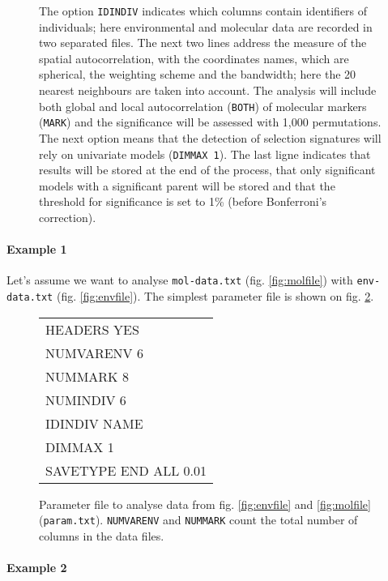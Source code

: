 \documentclass[a4paper,11pt]{article}
\begin{document}
\begin{figure}[htbp]
{The option \texttt{IDINDIV} indicates which columns contain identifiers of individuals; here environmental and molecular data are recorded in two separated files.
The next two lines address the measure of the spatial autocorrelation, with the coordinates names, which are spherical, the weighting scheme and the bandwidth; here the 20 nearest neighbours are taken into account.
The analysis will include both global and local autocorrelation (\texttt{BOTH}) of molecular markers (\texttt{MARK}) and the significance will be assessed with 1,000 permutations.
The next option means that the detection of selection signatures will rely on univariate models (\texttt{DIMMAX 1}).
The last ligne indicates that results will be stored at the end of the process, that only significant models with a significant parent will be stored and that the threshold for significance is set to 1\% (before Bonferroni's correction).
}
\label{fig:fichier-param-general}
\end{figure}

\paragraph{Example 1} 
Let's assume we want to analyse \verb+mol-data.txt+ (fig. \ref{fig:molfile}) with \verb+env-data.txt+ (fig. \ref{fig:envfile}).
The simplest parameter file is shown on fig. \ref{fig:fichier-param}.

\begin{figure}[htbp]
\centering
\ttfamily
\begin{tabular}{|l|}
\hline
HEADERS YES\\	
NUMVARENV 6\\	
NUMMARK 8	\\
NUMINDIV 6\\
IDINDIV NAME\\
DIMMAX 1\\
SAVETYPE END ALL 0.01\\
\hline
\end{tabular}%
\caption{Parameter file to analyse data from fig. \ref{fig:envfile} and \ref{fig:molfile} (\texttt{param.txt}). 
\texttt{NUMVARENV} and \texttt{NUMMARK} count the total number of columns in the data files.}
\label{fig:fichier-param}
\end{figure}


\paragraph{Example 2} 
\end{document}
